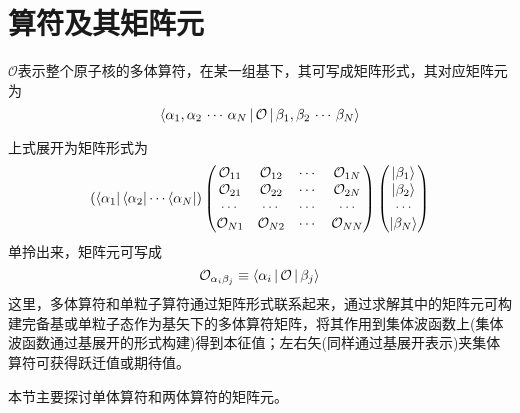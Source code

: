 \section{算符及其矩阵元}
$\mathcal{O}$表示整个原子核的多体算符，在某一组基下，其可写成矩阵形式，其对应矩阵元为
\begin{equation}
    \Braket{\alpha_1, \alpha_2\,\cdots\, \alpha_N | \mathcal{O} | \beta_1, \beta_2\,\cdots\, \beta_N}
\end{equation}
\begin{note}
    上式展开为矩阵形式为
    \begin{equation*}
        \left(\bra{\alpha_1}\bra{\alpha_2}\cdots\bra{\alpha_N}\right)
        \begin{pmatrix}
            \mathcal{O}_{11} & \mathcal{O}_{12} & \cdots & \mathcal{O}_{1N} \\
            \mathcal{O}_{21} & \mathcal{O}_{22} & \cdots & \mathcal{O}_{2N} \\
            \cdots & \cdots & \cdots & \cdots \\
            \mathcal{O}_{N1} & \mathcal{O}_{N2} & \cdots & \mathcal{O}_{NN} \\
        \end{pmatrix}
        \begin{pmatrix}
            \ket{\beta_1} \\
            \ket{\beta_2} \\
            \cdots \\
            \ket{\beta_N}
        \end{pmatrix}
    \end{equation*}
    单拎出来，矩阵元可写成
    \begin{equation}
        \mathcal{O}_{\alpha_i\beta_j} \equiv \Braket{\alpha_i | \mathcal{O} | \beta_j}
    \end{equation}
    这里，多体算符和单粒子算符通过矩阵形式联系起来，通过求解其中的矩阵元可构建完备基或单粒子态作为基矢下的多体算符矩阵，将其作用到集体波函数上(集体波函数通过基展开的形式构建)得到本征值；左右矢(同样通过基展开表示)夹集体算符可获得跃迁值或期待值。
\end{note}
本节主要探讨单体算符和两体算符的矩阵元。

